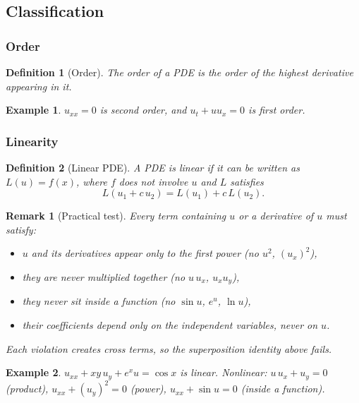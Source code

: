 \documentclass{article}
\newtheorem{definition}{Definition}
\newtheorem*{example}{Example}
\newtheorem{remark}{Remark}
\begin{document}
\subsection{Classification}
\subsubsection{Order}
\begin{definition}[Order]
    The order of a PDE is the order of the highest derivative appearing in it.
\end{definition}
\begin{example}
    $u_{xx} = 0$ is second order, and $u_t + u u_x = 0$ is first order.
\end{example}

\subsubsection{Linearity}
\begin{definition}[Linear PDE]
    A PDE is linear if it can be written as $L(u) = f(x)$, where $f$ does not involve $u$ and $L$ satisfies
    \begin{equation}
        L(u_1 + c\,u_2) = L(u_1) + c\,L(u_2).
    \end{equation}
\end{definition}
\begin{remark}[Practical test]
    Every term containing $u$ or a derivative of $u$ must satisfy:
    \begin{itemize}
        \item $u$ and its derivatives appear only to the first power (no $u^2$, $(u_x)^2$),
        \item they are never multiplied together (no $u\,u_x$, $u_x u_y$),
        \item they never sit inside a function (no $\sin u$, $e^u$, $\ln u$),
        \item their coefficients depend only on the independent variables, never on $u$.
    \end{itemize}
    Each violation creates cross terms, so the superposition identity above fails.
\end{remark}
\begin{example}
    $u_{xx} + xy\,u_y + e^x u = \cos x$ is linear. Nonlinear: $u\,u_x + u_y = 0$ (product), $u_{xx} + (u_y)^2 = 0$ (power), $u_{xx} + \sin u = 0$ (inside a function).
\end{example}
\end{document}
